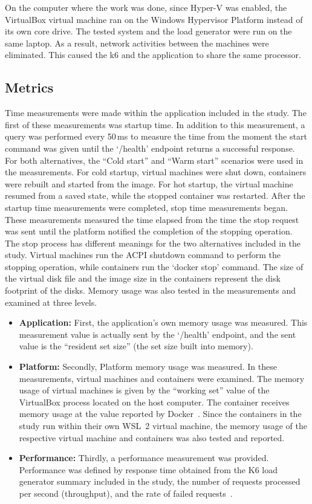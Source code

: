 \documentclass[conference,a4paper]{IEEEtran}
\begin{document}
On the computer where the work was done, since Hyper-V was enabled, the VirtualBox virtual machine ran on the Windows Hypervisor Platform instead of its own core drive. The tested system and the load generator were run on the same laptop. As a result, network activities between the machines were eliminated. This caused the k6 and the application to share the same processor.

\subsection{Metrics}
Time measurements were made within the application included in the study. The first of these measurements was startup time. In addition to this measurement, a query was performed every 50\,ms to measure the time from the moment the start command was given until the `/health' endpoint returns a successful response. For both alternatives, the ``Cold start'' and ``Warm start'' scenarios were used in the measurements. For cold startup, virtual machines were shut down, containers were rebuilt and started from the image. For hot startup, the virtual machine resumed from a saved state, while the stopped container was restarted. After the startup time measurements were completed, stop time measurements began. These measurements measured the time elapsed from the time the stop request was sent until the platform notified the completion of the stopping operation. The stop process has different meanings for the two alternatives included in the study. Virtual machines run the ACPI shutdown command to perform the stopping operation, while containers run the `docker stop' command. The size of the virtual disk file and the image size in the containers represent the disk footprint of the disks. Memory usage was also tested in the measurements and examined at three levels.
\begin{itemize}
	\item \textbf{Application:} First, the application's own memory usage was measured. This measurement value is actually sent by the `/health' endpoint, and the sent value is the ``resident set size'' (the set size built into memory).
	\item \textbf{Platform:} Secondly, Platform memory usage was measured. In these measurements, virtual machines and containers were examined. The memory usage of virtual machines is given by the ``working set'' value of the VirtualBox process located on the host computer. The container receives memory usage at the value reported by Docker~\cite{b3}. Since the containers in the study run within their own WSL~2 virtual machine, the memory usage of the respective virtual machine and containers was also tested and reported.
	\item \textbf{Performance:} Thirdly, a performance measurement was provided. Performance was defined by response time obtained from the K6 load generator summary included in the study, the number of requests processed per second (throughput), and the rate of failed requests~\cite{b8}.
\end{itemize}
\end{document}
